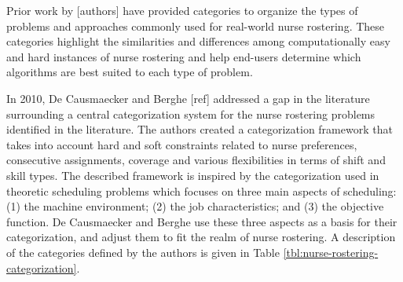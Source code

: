 Prior work by [authors] have   %
provided categories to organize the types of problems and approaches
commonly used for real-world nurse rostering.
These categories highlight the similarities
and differences
among computationally easy and hard instances of nurse rostering and 
help end-users determine
which algorithms
are best suited to each type of problem.

In 2010, De Causmaecker and Berghe [ref] addressed a gap in the literature 
surrounding a central categorization system for the nurse rostering problems identified in the literature.
The authors created a categorization framework that takes into account
hard and soft constraints related to nurse preferences, consecutive
assignments, coverage and various flexibilities in terms of shift and 
skill types. The described framework is inspired by the categorization used
in theoretic scheduling problems which focuses on three main aspects of scheduling:
(1) the machine environment;
(2) the job characteristics;
and (3) the objective function.
De Causmaecker and Berghe use these three aspects as a basis for their categorization,
and adjust them to fit the realm of nurse rostering. A description of the categories defined
by the authors is given in Table \ref{tbl:nurse-rostering-categorization}.

